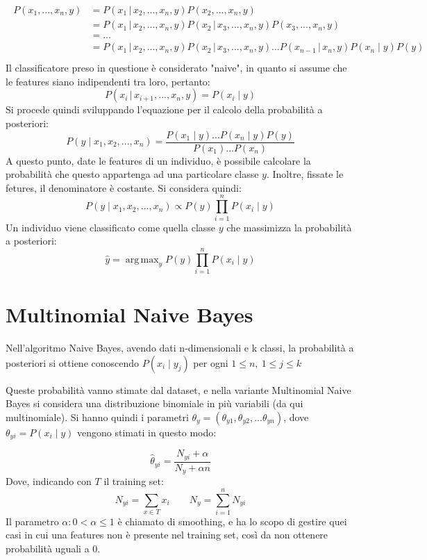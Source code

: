 \documentclass[oneside]{book}
\DeclareMathOperator*{\argmax}{arg\,max}
\begin{document}
\begin{align}
\begin{split}\label{eq:1}
P(x_1, ..., x_n, y){} &=  P(x_1 \,|\, x_2, ..., x_n, y)P(x_2, ..., x_n, y)\\
&= P(x_1 \,|\, x_2, ..., x_n, y)P(x_2\, |\, x_3, ..., x_n, y)P(x_3, ..., x_n, y)\\
&= ...\\
&= P(x_1 \,|\, x_2, ..., x_n, y)P(x_2\, |\, x_3, ..., x_n, y)...P(x_{n-1}\,|\,x_n,y)P(x_n \mid y)P(y)\\
\end{split}
\end{align}
Il classificatore preso in questione è considerato "naive", in quanto si assume che le features siano indipendenti tra loro, pertanto:
$$P(x_i\,|\, x_{i+1}, ...,x_n, y) = P(x_i \mid y)$$
Si procede quindi sviluppando l'equazione per il calcolo della probabilità a posteriori:
$$P(y \mid x_1, x_2, ..., x_n) =
\frac
	{P(x_1 \mid y)...P(x_n \mid y)P(y)}
	{P(x_1)...P(x_n)}$$
A questo punto, date le features di un individuo, è possibile calcolare la probabilità che questo appartenga ad una particolare classe $y$. Inoltre, fissate le fetures, il denominatore è costante. Si considera quindi:
$$P(y \mid x_1, x_2, ..., x_n) \propto
P(y)\prod\limits_{i=1}^{n}P(x_i \mid y)
$$
Un individuo viene classificato come quella classe $y$ che massimizza la probabilità a posteriori:
$$\hat{y} = \argmax_y P(y)\prod\limits_{i=1}^{n}P(x_i \mid y)$$


\section{Multinomial Naive Bayes}
Nell'algoritmo Naive Bayes, avendo dati n-dimensionali e k classi, la probabilità a posteriori si ottiene conoscendo $P(x_i \mid y_j)$ per ogni $1\leq n,\ 1\leq j \leq k$

Queste probabilità vanno stimate dal dataset, e nella variante Multinomial Naive Bayes si considera una distribuzione binomiale in più variabili (da qui multinomiale). Si hanno quindi i parametri $\theta_y = (\theta_{y1}, \theta_{y2}, ...\theta_{yn})$, dove $\theta_{yi} = P(x_i \mid y)$ vengono stimati in questo modo:

$$\hat{\theta}_{yi} = \frac{N_{yi} + \alpha }{N_{y} + \alpha n}$$
Dove, indicando con $T$ il training set:
$$N_{yi} = \sum_{x \in T}x_i \qquad
N_{y} = \sum_{i=1}^{n}N_{yi}$$
Il parametro $\alpha: 0 < \alpha \leq 1$ è chiamato di smoothing, e ha lo scopo di gestire quei casi in cui una features non è presente nel training set, così da non ottenere probabilità uguali a $0$.
\end{document}
